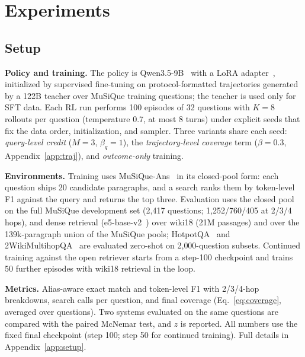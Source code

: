 
\section{Experiments}
\label{sec:results}

\subsection{Setup}
\label{sec:setup}

\textbf{Policy and training.} The policy is Qwen3.5-9B~\citep{yang2025qwen3}
with a LoRA adapter~\citep{hu2021lora}, initialized by supervised
fine-tuning on protocol-formatted trajectories generated by a 122B
teacher over MuSiQue training questions; the teacher is used only for
SFT data. Each RL run performs 100 episodes of 32 questions with $K=8$
rollouts per question (temperature 0.7, at most 8 turns) under explicit
seeds that fix the data order, initialization, and sampler. Three
variants share each seed: \emph{query-level credit} ($M=3$,
$\beta_q=1$), the \emph{trajectory-level coverage} term ($\beta=0.3$,
Appendix~\ref{app:traj}), and \emph{outcome-only} training.

\textbf{Environments.} Training uses MuSiQue-Ans~\citep{trived2022musique}
in its closed-pool form: each question ships 20 candidate paragraphs,
and a search ranks them by token-level F1 against the query and returns
the top three. Evaluation uses the closed pool on the full MuSiQue
development set (2{,}417 questions; 1{,}252/760/405 at 2/3/4 hops), and
dense retrieval (e5-base-v2~\citep{wang2024text,Jin2025flashrag}) over
wiki18 (21M passages) and over the 139k-paragraph union of the MuSiQue
pools; HotpotQA~\citep{yang2018hotpotqa} and
2WikiMultihopQA~\citep{ho2020constructing} are evaluated zero-shot on
2{,}000-question subsets. Continued training against the open retriever
starts from a step-100 checkpoint and trains 50 further episodes with
wiki18 retrieval in the loop.

\textbf{Metrics.} Alias-aware exact match and token-level F1 with
2/3/4-hop breakdowns, search calls per question, and final coverage
(Eq.~\ref{eq:coverage}, averaged over questions). Two systems evaluated
on the same questions are compared with the paired McNemar test, and
$z$ is reported. All numbers use the fixed final checkpoint (step 100;
step 50 for continued training). Full details in
Appendix~\ref{app:setup}.

